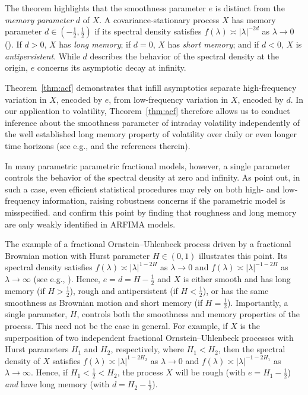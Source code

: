 \documentclass[ecta,nameyear,draft]{econsocart}
\newcommand{\1}{\mathbf 1}
\numberwithin{equation}{section}
\begin{document}
The theorem highlights that the smoothness parameter $e$  is distinct from the \emph{memory parameter} $d$ of $X$.  A covariance-stationary process $X$ has memory parameter $d\in(-\frac12,\frac12)$ if its spectral density satisfies $f(\lambda) \asymp \lvert\lambda\rvert^{-2d}$ as $\lambda\to0$ (\cite{DG02}). If $d>0$, $X$ has \emph{long memory}; if $d=0$, $X$ has \emph{short memory}; and if $d<0$, $X$ is \emph{antipersistent}. While $d$ describes the behavior of the spectral density at the origin, $e$ concerns its asymptotic decay at infinity. 

  Theorem~\ref{thm:acf} demonstrates that
infill asymptotics  separate  high-frequency variation in $X$,   encoded by $e$, from    low-frequency variation in $X$,  encoded by $d$. In our application to volatility, Theorem~\ref{thm:acf} therefore allows us to conduct inference about the smoothness parameter of intraday volatility independently of the well established long memory property of volatility over daily or even longer time horizons (see e.g., \cite{ABDL03} and the references therein).

In many parametric parametric fractional models, however, a single parameter controls the behavior of the spectral density at zero and infinity. As \cite{MW08} point out, in such a case, even efficient statistical procedures may rely on both high- and low-frequency information, raising robustness concerns if the parametric model is misspecified. 
 \cite{shi2023volatility} and \cite{LPSY25} confirm this point by finding that roughness and long memory are only weakly identified in ARFIMA models. 
 
The example of a fractional Ornstein--Uhlenbeck process driven by a fractional Brownian motion with Hurst parameter $H\in(0,1)$ illustrates this point. Its spectral density satisfies $f(\lambda) \asymp \lvert\lambda\rvert^{1-2H}$ as $\lambda\to0$ and $f(\lambda) \asymp \lvert\lambda\rvert^{-1-2H}$ as $\lambda\to\infty$ (see e.g., \cite{SYZ24}). Hence, $e=d=H-\frac12$ and $X$ is either smooth and has long memory (if $H>\frac12$),  rough and antipersistent (if $H<\frac12$), or has the same smoothness as Brownian motion and short memory (if $H=\frac12$). Importantly, a single parameter, $H$, controls both the smoothness and memory properties of the process. This need not be the case in general. For example,  if $X$ is the superposition of two independent fractional Ornstein--Uhlenbeck processes with Hurst parameters $H_1$ and $H_2$, respectively, where $H_1<H_2$, then the spectral density of $X$ satisfies $f(\lambda) \asymp \lvert\lambda\rvert^{1-2H_2}$ as $\lambda\to0$ and $f(\lambda) \asymp \lvert\lambda\rvert^{-1-2H_1}$ as $\lambda\to\infty$. Hence, if $H_1<\frac12<H_2$, the process $X$ will be rough (with $e=H_1-\frac12$)  \emph{and} have long memory (with $d=H_2-\frac12$).
 
\end{document}
